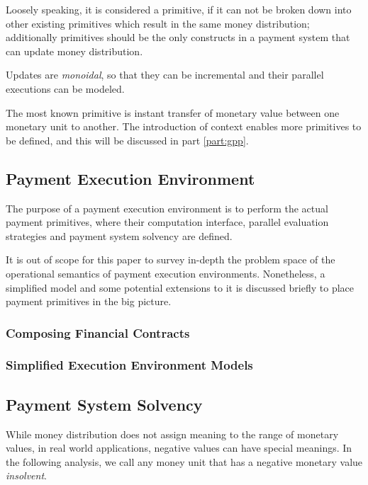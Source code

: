 Loosely speaking, it is considered a primitive, if it can not be broken down into other existing
primitives which result in the same money distribution; additionally primitives should be the only
constructs in a payment system that can update money distribution.

Updates are \textit{monoidal}, so that they can be incremental and their parallel executions can be
modeled.

The most known primitive is instant transfer of monetary value between one monetary unit to
another. The introduction of context enables more primitives to be defined, and this will be
discussed in part \ref{part:gpp}.

\subsection{Payment Execution Environment}

The purpose of a payment execution environment is to perform the actual payment primitives, where
their computation interface, parallel evaluation strategies and payment system solvency are defined.

It is out of scope for this paper to survey in-depth the problem space of the operational semantics
of payment execution environments. Nonetheless, a simplified model and some potential extensions to
it is discussed briefly to place payment primitives in the big picture.

\subsubsection{Composing Financial Contracts}



\subsubsection{Simplified Execution Environment Models}



\subsection{Payment System Solvency}

While money distribution does not assign meaning to the range of monetary values, in real world
applications, negative values can have special meanings. In the following analysis, we call any
money unit that has a negative monetary value \textit{insolvent}.


